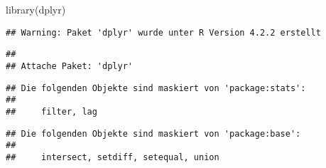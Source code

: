 \documentclass[
]{article}
\newenvironment{Shaded}{\begin{snugshade}}{\end{snugshade}}
\newcommand{\FunctionTok}[1]{\textcolor[rgb]{0.00,0.00,0.00}{#1}}
\newcommand{\NormalTok}[1]{#1}
\begin{document}
\begin{Shaded}
\begin{Highlighting}[]
\FunctionTok{library}\NormalTok{(dplyr)}
\end{Highlighting}
\end{Shaded}

\begin{verbatim}
## Warning: Paket 'dplyr' wurde unter R Version 4.2.2 erstellt
\end{verbatim}

\begin{verbatim}
## 
## Attache Paket: 'dplyr'
\end{verbatim}

\begin{verbatim}
## Die folgenden Objekte sind maskiert von 'package:stats':
## 
##     filter, lag
\end{verbatim}

\begin{verbatim}
## Die folgenden Objekte sind maskiert von 'package:base':
## 
##     intersect, setdiff, setequal, union
\end{verbatim}
\end{document}
